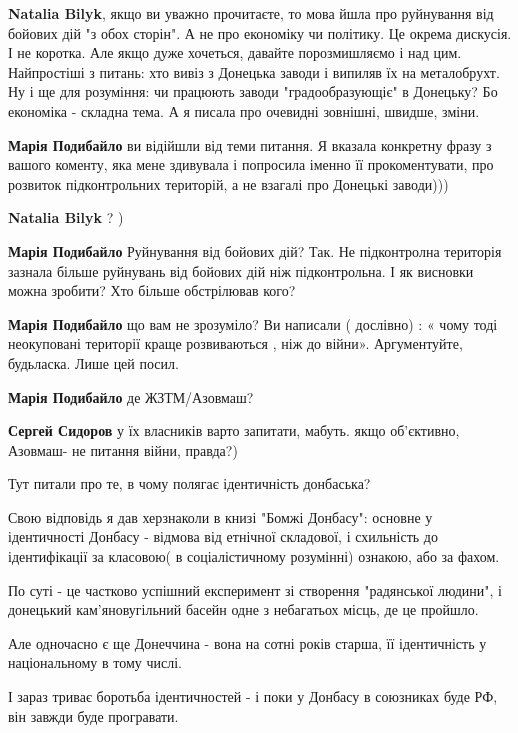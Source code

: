 \begin{itemize}
\begin{itemize}
\textbf{Natalia Bilyk}, якщо ви уважно прочитаєте, то мова йшла про руйнування від бойових дій "з обох сторін". А не про економіку чи політику. Це окрема дискусія. І не коротка. Але якщо дуже хочеться, давайте порозмишляємо і над цим. Найпростіші з питань: хто вивіз з Донецька заводи і випиляв їх на металобрухт. Ну і ще для розуміння: чи працюють заводи "градообразующіє" в Донецьку? Бо економіка - складна тема. А я писала про очевидні зовнішні, швидше, зміни.

\textbf{Марія Подибайло} ви відійшли від теми питання. Я вказала конкретну фразу з вашого коменту, яка мене здивувала і попросила іменно її прокоментувати, про розвиток підконтрольних територій, а не взагалі про Донецькі заводи)))

\textbf{Natalia Bilyk} ? )

\textbf{Марія Подибайло} Руйнування від бойових дій? Так. Не підконтролна територія зазнала більше руйнувань від бойових дій ніж підконтрольна. І як висновки можна зробити? Хто більше обстрілював кого?

\textbf{Марія Подибайло} що вам не зрозуміло? Ви написали ( дослівно) : « чому тоді неокуповані території краще розвиваються , ніж до війни». Аргументуйте, будьласка. Лише цей посил.

\textbf{Марія Подибайло} де ЖЗТМ/Азовмаш?

\textbf{Сергей Сидоров} у їх власників варто запитати, мабуть. якщо об'єктивно, Азовмаш- не питання війни, правда?)
\end{itemize} %


Тут питали про те, в чому полягає ідентичність донбаська?

Свою відповідь я дав херзнаколи в книзі "Бомжі Донбасу": основне у ідентичності
Донбасу - відмова від етнічної складової, і схильність до ідентифікації за
класовою( в соціалістичному розумінні) ознакою, або за фахом.

По суті - це частково успішний експеримент зі створення "радянської людини", і
донецький кам'яновугільний басейн одне з небагатьох місць, де це пройшло.

Але одночасно є ще Донеччина - вона на сотні років старша, її ідентичність у
національному в тому числі.

І зараз триває боротьба ідентичностей - і поки у Донбасу в союзниках буде РФ,
він завжди буде програвати.


\end{itemize}
